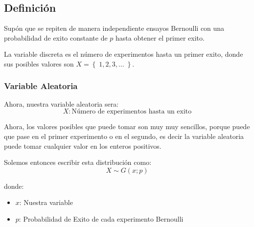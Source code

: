 \documentclass[12pt, fleqn]{report}                             %
\theoremstyle{break}                                            %
\newcommand{\Set}[1]{\left\{ \; #1 \; \right\}}                 %
\begin{document}
            \subsection{Definición}

                Supón que se repiten de manera independiente ensayos Bernoulli
                con una probabilidad de exito constante de $p$ hasta obtener el primer
                exito.

                La variable discreta es el número de experimentos hasta un primer exito,
                donde sus posibles valores son $X = \Set{1, 2, 3, \dots}$.


                \vspace{1em}
                \subsubsection{Variable Aleatoria}

                    Ahora, nuestra variable aleatoria sera:
                    \begin{equation*}
                        X : \text{Número de experimentos hasta un exito}
                    \end{equation*}

                    Ahora, los valores posibles que puede tomar son muy muy sencillos,
                    porque puede que pase en el primer experimento o en el segundo, 
                    es decir la variable aleatoria puede tomar cualquier valor en los enteros
                    positivos.

                    Solemos entonces escribir esta distribución como:
                    \begin{equation*}
                        X \sim G(x; p)
                    \end{equation*}

                    donde:
                    \begin{itemize}
                        \item $x$: Nuestra variable
                        \item $p$: Probabilidad de Exito de cada experimento Bernoulli
                    \end{itemize}
\end{document}
